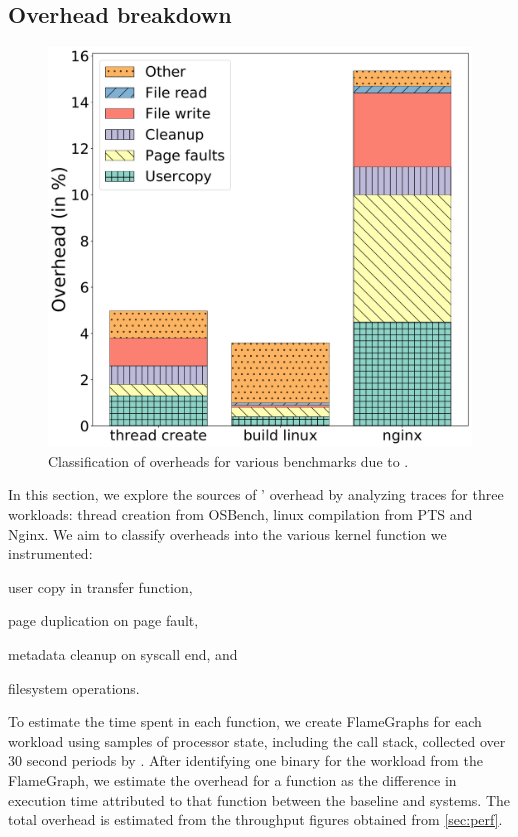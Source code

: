\subsection{Overhead breakdown}

\begin{figure}
  \centering
  \includegraphics[width=\linewidth]{media/midas/overhead.pdf}
  \caption{Classification of overheads for various benchmarks due to \midas.}
  \label{fig:overhead_class}
\end{figure}

In this section, we explore the sources of \midas' overhead by analyzing
 traces for three workloads: thread creation from OSBench, linux
compilation from PTS and Nginx.
We aim to classify overheads into the various kernel function we instrumented:
\begin{inparaenum}
\item user copy in transfer function,
\item page duplication on page fault,
\item metadata cleanup on syscall end, and
\item filesystem operations.
\end{inparaenum}

To estimate the time spent in each function, we create FlameGraphs for
each workload\cite{GreggFlameGraph} using samples of processor state, including
the call stack, collected over 30 second periods by .
After identifying one binary for the workload from the FlameGraph, we estimate
the overhead for a function as the difference in execution time attributed to
that function between the baseline and \midas systems.
The total overhead is estimated from the throughput figures obtained from
\autoref{sec:perf}.

